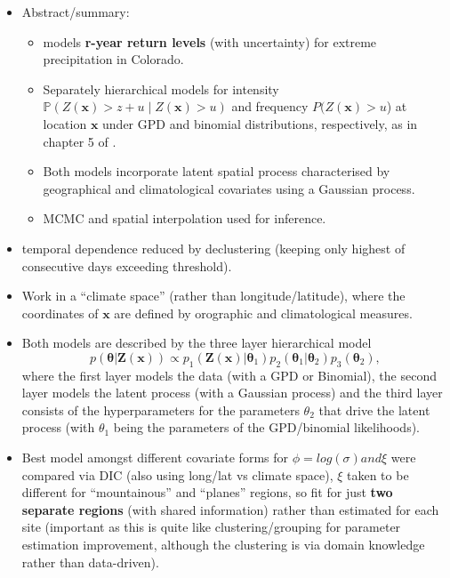 \documentclass{article}
\numberwithin{equation}{section}
\begin{document}
\begin{itemize}
  \item Abstract/summary:
    \begin{itemize}
      \item \cite{Cooley2007} models \textbf{r-year return levels} (with uncertainty) for extreme precipitation in Colorado.
      \item Separately hierarchical models for intensity $\mathbb{P}(Z(\bm{x}) > z + u \mid Z(\bm{x}) > u)$ and frequency $P(Z(\bm{x}) > u$) at location $\bm{x}$ under GPD and binomial distributions, respectively, as in chapter 5 of \cite{Coles2001}. 
      \item Both models incorporate latent spatial process characterised by geographical and climatological covariates using a Gaussian process. 
      \item MCMC and spatial interpolation used for inference. 
    \end{itemize}
    \item temporal dependence reduced by declustering (keeping only highest of consecutive days exceeding threshold). 
    \item Work in a ``climate space'' (rather than longitude/latitude), where the coordinates of $\bm{x}$ are defined by orographic and climatological measures. 
    \item Both models are described by the three layer hierarchical model
      \[
        p(\bm{\theta} | \bm{Z}(\bm{x})) \propto p_1(\bm{Z}(\bm{x}) | \bm{\theta}_1) p_2(\bm{\theta}_1 | \bm{\theta}_2) p_3(\bm{\theta}_2),
      \]
      where the first layer models the data (with a GPD or Binomial), the second layer models the latent process (with a Gaussian process) and the third layer consists of the hyperparameters for the parameters $\theta_2$ that drive the latent process (with $\theta_1$ being the parameters of the GPD/binomial likelihoods). 
    \item Best model amongst different covariate forms for $\phi = log(\sigma) and \xi$ were compared via DIC (also using long/lat vs climate space), $\xi$ taken to be different for ``mountainous'' and ``planes'' regions, so fit for just \textbf{two separate regions} (with shared information) rather than estimated for each site (important as this is quite like clustering/grouping for parameter estimation improvement, although the clustering is via domain knowledge rather than data-driven). 
\end{itemize}
\end{document}
